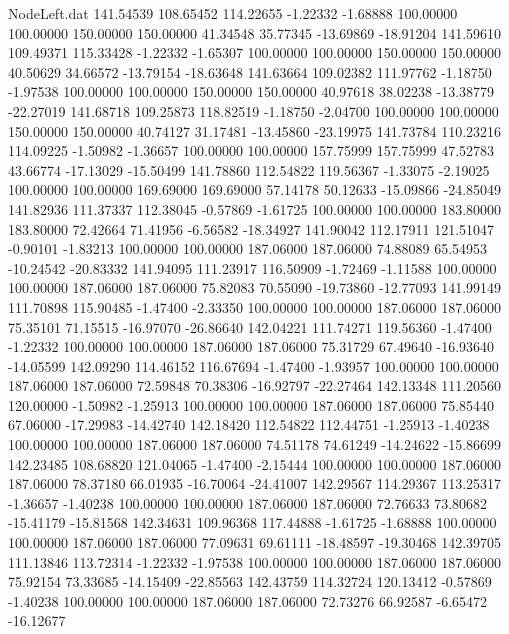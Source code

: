 \begin{filecontents}{NodeLeft.dat}
 141.54539  108.65452  114.22655    -1.22332   -1.68888  100.00000  100.00000  150.00000  150.00000   41.34548   35.77345  -13.69869  -18.91204
 141.59610  109.49371  115.33428    -1.22332   -1.65307  100.00000  100.00000  150.00000  150.00000   40.50629   34.66572  -13.79154  -18.63648
 141.63664  109.02382  111.97762    -1.18750   -1.97538  100.00000  100.00000  150.00000  150.00000   40.97618   38.02238  -13.38779  -22.27019
 141.68718  109.25873  118.82519    -1.18750   -2.04700  100.00000  100.00000  150.00000  150.00000   40.74127   31.17481  -13.45860  -23.19975
 141.73784  110.23216  114.09225    -1.50982   -1.36657  100.00000  100.00000  157.75999  157.75999   47.52783   43.66774  -17.13029  -15.50499
 141.78860  112.54822  119.56367    -1.33075   -2.19025  100.00000  100.00000  169.69000  169.69000   57.14178   50.12633  -15.09866  -24.85049
 141.82936  111.37337  112.38045    -0.57869   -1.61725  100.00000  100.00000  183.80000  183.80000   72.42664   71.41956   -6.56582  -18.34927
 141.90042  112.17911  121.51047    -0.90101   -1.83213  100.00000  100.00000  187.06000  187.06000   74.88089   65.54953  -10.24542  -20.83332
 141.94095  111.23917  116.50909    -1.72469   -1.11588  100.00000  100.00000  187.06000  187.06000   75.82083   70.55090  -19.73860  -12.77093
 141.99149  111.70898  115.90485    -1.47400   -2.33350  100.00000  100.00000  187.06000  187.06000   75.35101   71.15515  -16.97070  -26.86640
 142.04221  111.74271  119.56360    -1.47400   -1.22332  100.00000  100.00000  187.06000  187.06000   75.31729   67.49640  -16.93640  -14.05599
 142.09290  114.46152  116.67694    -1.47400   -1.93957  100.00000  100.00000  187.06000  187.06000   72.59848   70.38306  -16.92797  -22.27464
 142.13348  111.20560  120.00000    -1.50982   -1.25913  100.00000  100.00000  187.06000  187.06000   75.85440   67.06000  -17.29983  -14.42740
 142.18420  112.54822  112.44751    -1.25913   -1.40238  100.00000  100.00000  187.06000  187.06000   74.51178   74.61249  -14.24622  -15.86699
 142.23485  108.68820  121.04065    -1.47400   -2.15444  100.00000  100.00000  187.06000  187.06000   78.37180   66.01935  -16.70064  -24.41007
 142.29567  114.29367  113.25317    -1.36657   -1.40238  100.00000  100.00000  187.06000  187.06000   72.76633   73.80682  -15.41179  -15.81568
 142.34631  109.96368  117.44888    -1.61725   -1.68888  100.00000  100.00000  187.06000  187.06000   77.09631   69.61111  -18.48597  -19.30468
 142.39705  111.13846  113.72314    -1.22332   -1.97538  100.00000  100.00000  187.06000  187.06000   75.92154   73.33685  -14.15409  -22.85563
 142.43759  114.32724  120.13412    -0.57869   -1.40238  100.00000  100.00000  187.06000  187.06000   72.73276   66.92587   -6.65472  -16.12677

\end{filecontents}
